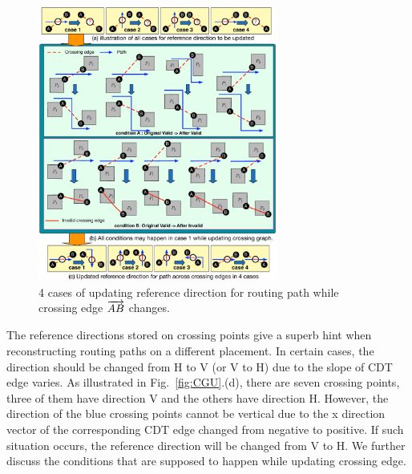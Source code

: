       \begin{figure}[t]
        \begin{center}
          \includegraphics[width=0.7\textwidth]{Fig/Chapter4/dirch.eps}
          \caption{4 cases of updating reference direction for routing path while crossing edge $\protect\overrightarrow{AB}$ changes.}
          \label{fig:dirch}
        \end{center}
      \end{figure}

      The reference directions stored on crossing points give a superb hint when reconstructing routing paths on a different placement.
      In certain cases, the direction should be changed from H to V (or V to H) due to the slope of CDT edge varies. As illustrated in Fig.~\ref{fig:CGU}.(d), there are seven crossing points, three of them have direction V and the others have direction H. However, the direction of the blue crossing points cannot be vertical due to the x direction vector of the corresponding CDT edge changed from negative to positive. If such situation occurs, the reference direction will be changed from V to H. We further discuss the conditions that are supposed to happen while updating crossing edge.

